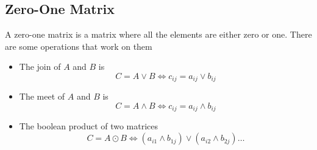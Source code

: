 \documentclass{article}
\theoremstyle{mytheoremstyle}
\theoremstyle{mytheoremstyle}
\theoremstyle{myproblemstyle}
\begin{document}
    \subsection*{Zero-One Matrix}
    A zero-one matrix is a matrix where all the elements are either zero or one.
    There are some operations that work on them
    \begin{itemize}
        \item The join of $A$ and $B$ is
            \[
                C=A \vee B \Leftrightarrow c_{ij} = a_{ij} \vee b_{ij}
            \]
        \item The meet of $A$ and $B$ is
            \[
                C=A \wedge B \Leftrightarrow c_{ij} = a_{ij} \wedge b_{ij}
            \]
        \item The boolean product of two matrices
            \[
                C=A\odot B \Leftrightarrow (a_{i1} \wedge b_{1j}) \vee (a_{i2} \wedge b_{2j})\dots
            \]
    \end{itemize}
\end{document}
